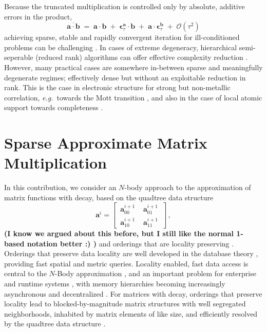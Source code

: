 \documentclass[letterpaper,twocolumn,amsmath,amsfont,amssymb,english,aps,jcp,preprintnumbers,groupaddress,nofootinbib,tightenlines,floatfix]{revtex4}
\newcommand{\mat}[1]{\boldsymbol{#1}}
\theoremstyle{plain}
\theoremstyle{remark}
\theoremstyle{plain}
\begin{document}
Because the truncated multiplication is controlled only by absolute,
additive errors in the product,
\begin{equation} \label{sparseapprox}
\overline{ \mat{a} \cdot \mat{b} }\; = \; \mat{a}\cdot\mat{b} \; +\; \mat{\epsilon}^{\mat{a}}_\tau \cdot \mat{b} \;+\;
 \mat{a} \cdot \mat{\epsilon}^{\mat{b}}_\tau  \; + \;   {\mathcal O}(\tau^2)
\end{equation}
achieving sparse, stable and rapidly convergent iteration for
ill-conditioned problems can be challenging \cite{}.  In cases of
extreme degeneracy, hierarchical semi-seperable (reduced rank)
algorithms can offer effective complexity reduction \cite{}.  However,
many practical cases are somewhere in-between sparse and meaningfully
degenerate regimes; effectively dense but without an exploitable
reduction in rank.  This is the case in electronic structure for
strong but non-metallic correlation, {\em e.g.}~towards the Mott
transition \cite{}, and also in the case of local atomic support
towards completeness \cite{Others, Hutter, Gigi}.

\pagebreak

\section{Sparse Approximate Matrix Multiplication}

In this contribution, we consider an $N$-body approach to the
approximation of matrix functions with decay, based on the quadtree
data structure \cite{wise, samet}
\begin{equation}
\mat{a}^i = \begin{bmatrix} \,  \mat{a}^{i+1}_{00} \, & \,  \mat{a}^{i+1}_{01} \,  \\[0.2cm]  \, \mat{a}^{i+1}_{10} \,  & \,\mat{a}^{i+1}_{11} \, \end{bmatrix} \, ,
\end{equation}
{\bf (I know we argued about this before, but I still like the normal 1-based notation better :) )}
and orderings that are locality preserving \cite{}.  Orderings that
preserve data locality are well developed in the database theory
\cite{}, providing fast spatial and metric queries.  Locality
enabled, fast data access is central to the $N$-Body approximation
\cite{}, and an important problem for enterprise \cite{} and runtime
systems \cite{}, with memory hierarchies becoming increasingly
asynchronous and decentralized \cite{cache}.  For matrices with
decay, orderings that preserve locality lead to blocked-by-magnitude
matrix structures with well segregated neighborhoods, inhabited by
matrix elements of like size, and efficiently resolved by the quadtree
data structure \cite{}.
\end{document}
